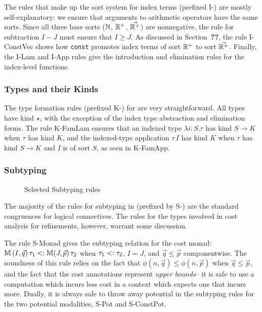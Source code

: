 The rules that make up the sort system for index terms (prefixed I-) are mostly self-explanatory: we ensure that arguments to arithmetic operators have the same sorts.
Since all three base sorts ($\mathbb{N}$, $\mathbb{R}^+$, $\vec{\mathbb{R}^+}$) are nonnegative, the rule for subtraction $I - J$ must ensure that $I \geq J$. As discussed in Section~\textbf{??}, the rule I-ConstVec shows how \texttt{const} promotes index terms of sort $\mathbb{R}^+$ to sort $\vec{\mathbb{R}^+}$. Finally, the I-Lam and I-App rules give the introduction and elimination rules for the index-level functions.

\subsubsection{Types and their Kinds}
The type formation rules (prefixed K-) for \dlambdaamor are very straightforward. All types have kind $\star$, with the exception of the index type abstraction and elimination forms. The rule K-FamLam ensures that an indexed type $\lambda i : S. \tau$ has kind $S \to K$ when $\tau$ has kind $K$, and the indexed-type application $\tau \, I$ has kind $K$ when $\tau$ has kind $S \to K$ and $I$ is of sort $S$, as seen in K-FamApp.

\subsubsection{Subtyping}
\begin{figure}

\caption{Selected Subtyping rules}
\label{fig:dlambdaamor-selected-subty-rules}
\end{figure}
The majority of the rules for subtyping in \dlambdaamor (prefixed by S-) are the standard congruences for logical connectives. The rules for the types involved in cost analysis for refinements, however, warrant some discussion.

The rule S-Monad gives the subtyping relation for the cost monad: $\mathbb{M} \, (I,\vec{q}) \, \tau_1 <: \mathbb{M} (J,\vec{p}) \,\tau_2$ when $\tau_1 <: \tau_2$, $I = J$, and $\vec{q} \leq \vec{p}$ componentwise. The soundness of this rule relies on the fact that $\phi(n,\vec{q}) \leq \phi(n,\vec{p})$ when $\vec{q} \leq \vec{p}$, and the fact that the cost annotations represent \textit{upper bounds}-- it is safe to use a computation which incurs less cost in a context which expects one that incurs more. Dually, it is always safe to throw away potential in the subtyping rules for the two potential modalities, S-Pot and S-ConstPot.

